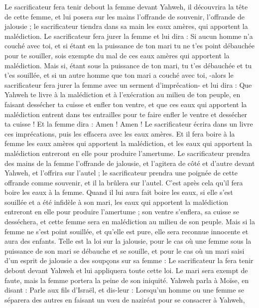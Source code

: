 \begin{multicols}{2}
Le sacrificateur fera tenir debout la femme devant Yahweh, il découvrira la tête de cette femme, et lui posera sur les mains l’offrande de souvenir, l’offrande de jalousie ; le sacrificateur tiendra dans sa main les eaux amères, qui apportent la malédiction.
Le sacrificateur fera jurer la femme et lui dira : Si aucun homme n'a couché avec toi, et si étant en la puissance de ton mari tu ne t'es point débauchée pour te souiller, sois exempte du mal de ces eaux amères qui apportent la malédiction.
Mais si, étant sous la puissance de ton mari, tu t'es débauchée et tu t'es souillée, et si un autre homme que ton mari a couché avec toi,
-alors le sacrificateur fera jurer la femme avec un serment d'imprécation- et lui dira : Que Yahweh te livre à la malédiction et à l'exécration au milieu de ton peuple, en faisant dessécher ta cuisse et enfler ton ventre,
et que ces eaux qui apportent la malédiction entrent dans tes entrailles pour te faire enfler le ventre et dessécher ta cuisse ! Et la femme dira : Amen ! Amen !
Le sacrificateur écrira dans un livre ces imprécations, puis les effacera avec les eaux amères.
Et il fera boire à la femme les eaux amères qui apportent la malédiction, et les eaux qui apportent la malédiction entreront en elle pour produire l’amertume.
Le sacrificateur prendra des mains de la femme l’offrande de jalousie, et l’agitera de côté et d’autre devant Yahweh, et l'offrira sur l'autel ;
le sacrificateur prendra une poignée de cette offrande comme souvenir, et il la brûlera sur l'autel. C’est après cela qu’il fera boire les eaux à la femme.
Quand il lui aura fait boire les eaux, si elle s’est souillée et a été infidèle à son mari, les eaux qui apportent la malédiction entreront en elle pour produire l’amertume ; son ventre s’enflera, sa cuisse se desséchera, et cette femme sera en malédiction au milieu de son peuple.
Mais si la femme ne s'est point souillée, et qu'elle est pure, elle sera reconnue innocente et aura des enfants.
Telle est la loi sur la jalousie, pour le cas où une femme sous la puissance de son mari se débauche et se souille,
et pour le cas où un mari saisi d’un esprit de jalousie a des soupçons sur sa femme : Le sacrificateur la fera tenir debout devant Yahweh et lui appliquera toute cette loi.
Le mari sera exempt de faute, mais la femme portera la peine de son iniquité.
\TextTitle{[Le naziréat]}
\VerseOne{}Yahweh parla à Moïse, en disant :
Parle aux fils d'Israël, et dis-leur : Lorsqu’un homme ou une femme se séparera des autres en faisant un vœu de naziréat pour se consacrer à Yahweh,

\end{multicols}
